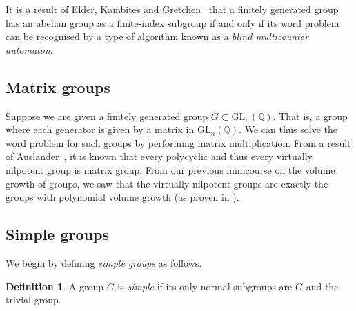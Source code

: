 \documentclass[11pt,a4paper,reqno]{amsart}
\theoremstyle{plain}
\theoremstyle{definition}
\newtheorem{definition}[theorem]{Definition}
\theoremstyle{definition}
\begin{document}
It is a result of Elder, Kambites and Gretchen~\cite{elder2008} that a finitely generated group has an abelian group as a finite-index subgroup if and only if its word problem can be recognised by a type of algorithm known as a \textit{blind multicounter automaton}.

\subsection{Matrix groups}

Suppose we are given a finitely generated group $G \subset \mathrm{GL}_n(\mathbb Q)$.
That is, a group where each generator is given by a matrix in $\mathrm{GL}_n(\mathbb Q)$.
We can thus solve the word problem for such groups by performing matrix multiplication.
From a result of Auslander~\cite[Theorem~2]{Auslander1967}, it is known that every polycyclic and thus every virtually nilpotent group is matrix group.
From our previous minicourse \cite{minicoursePrev} on the volume growth of groups, we saw that the virtually nilpotent groups are exactly the groups with polynomial volume growth (as proven in \cite{Gromov1981}).

\subsection{Simple groups}\label{sec:solvable-simple}

We begin by defining \emph{simple groups} as follows.

\begin{definition}
	A group $G$ is \emph{simple} if its only normal subgroups are $G$ and the trivial group.
\end{definition}
\end{document}
